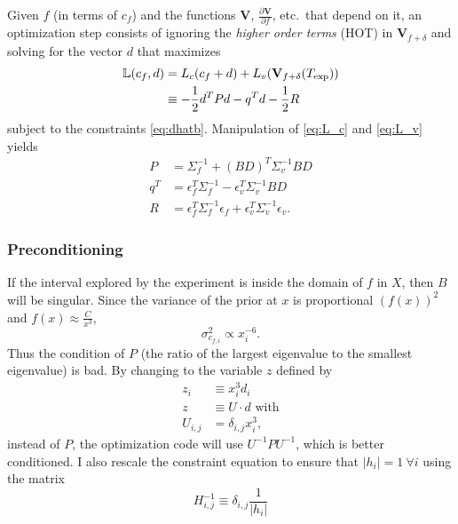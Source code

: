\documentclass[11pt]{article}
\newcommand{\partiald}[2]{\frac{\partial #1}{\partial #2}}
\newcommand\Vt{\mathbf{V}}
\newcommand\texp{T_{\rm{exp}}}
\newcommand\cf{c_f}
\newcommand\DVDf{\partiald{\Vt}{f}}
\newcommand\Lbb{\mathbb{L}}
\newcommand\epv{\epsilon_v}
\newcommand\epf{\epsilon_f}
\begin{document}
Given $f$ (in terms of $\cf$) and the functions $\Vt$, $\DVDf$, etc.\
that depend on it, an optimization step consists of ignoring the
\emph{higher order terms} (HOT) in $\Vt_{f+\delta}$ and solving for
the vector $d$ that maximizes
\begin{align*}
  \Lbb(\cf,d) &= L_c(\cf + d) + L_v(\Vt_{f+\delta}(\texp)) \\
  & \equiv -\frac{1}{2} d^T P d - q^T d -
    \frac{1}{2} R
\end{align*}
subject to the constraints \eqref{eq:dhatb}.  Manipulation of
\eqref{eq:L_c} and \eqref{eq:L_v} yields
\label{eq:PqR}
\begin{subequations}
  \begin{align}
    P &= \Sigma_f^{-1} + (BD)^T \Sigma_v^{-1} BD \\
    q^T &= \epf^T \Sigma_f^{-1} - \epv^T
          \Sigma_v^{-1} BD  \\
    \label{eq:R}
    R &= \epf^T \Sigma_f^{-1} \epf + \epv^T \Sigma_v^{-1} \epv.
  \end{align}
\end{subequations}
\subsubsection{Preconditioning}
\label{sec:preconditioning}

If the interval explored by the experiment is inside the domain of $f$
in $X$, then $B$ will be singular.  Since the variance of the prior at
$x$ is proportional $(f(x))^2$ and $f(x) \approx \frac{C}{x^3}$,
\begin{equation}
  \label{eq:var_f}
  \sigma^2_{c_{f,i}} \propto x_i^{-6}.
\end{equation}
Thus the condition of $P$ (the ratio of the largest eigenvalue to the
smallest eigenvalue) is bad.  By changing to the variable $z$ defined
by
\begin{align*}
  z_i &\equiv x_i^3 d_i \\
  z &\equiv U \cdot d \text{ with} \\
  U_{i,j} &= \delta_{i,j} x_i^3,
\end{align*}
\newcommand{\UI}{U^{-1}} instead of $P$, the optimization code will use
$\UI P \UI$, which is better conditioned.  I also rescale the
constraint equation to ensure that $\left| h_i \right|=1~\forall i$
using the matrix
\begin{equation*}
  H^{-1}_{i,j} \equiv \delta_{i,j} \frac{1}{\left|h_i\right|}
\end{equation*}
\end{document}
